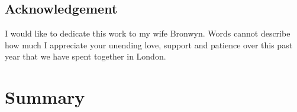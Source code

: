 \documentclass[11pt,preprint, authoryear]{article}
\title{
{\scshape\Large Department of Statistics 2019}\\
{\vskip 2.5em \scshape Predicting Community Engagement with Questions in the StackOverflow
Online Question-Answer Community}\\
}
\author{Candidate Number: 10140}
\subtitle{\vspace{4em} Submitted for the Master of Science, London School of Economics,
University of London} %
\date{\scshape August 2019}
\begin{document}
\pagestyle{fancy}
\chead{}
\rhead{}
\lfoot{}
\rfoot{} 
\lhead{}
\cfoot{\footnotesize \thepage\\}


\maketitle

\thispagestyle{empty}

\clearpage

\setcounter{page}{1}

\renewcommand{\contentsname}{Table of Contents}
\tableofcontents
\newpage
\listoffigures
\newpage
\listoftables
\newpage

\begin{center}
\section*{Acknowledgement}
\end{center}
I would like to dedicate this work to my wife Bronwyn. Words cannot describe how much I appreciate your unending love, support and patience over this past year that we have spent together in London.

\clearpage

\section*{Summary}
\end{document}
